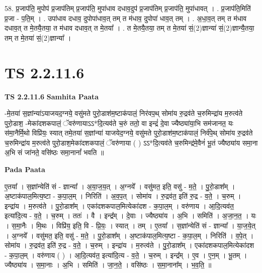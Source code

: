 \documentclass[17pt]{extarticle}
\begin{document}
58. प्र॒जाप॑ति॒ मुपोप॑ प्र॒जाप॑तिम् प्र॒जाप॑ति॒ मुपा॑धाव दधाव॒दुप॑ प्र॒जाप॑तिम् प्र॒जाप॑ति॒ मुपा॑धावत् । . प्र॒जाप॑ति॒मिति॑ प्र॒जा - प॒ति॒म् । . उपा॑धाव दधाव॒ दुपोपा॑धाव॒त् तम् त म॑धाव॒ दुपोपा॑ धाव॒त् तम् । . अ॒धा॒व॒त् तम् त म॑धाव दधाव॒त् त मे॒तयै॒तया॒ त म॑धाव दधाव॒त् त मे॒तया᳚ । . त मे॒तयै॒तया॒ तम् त मे॒तया॑ सं॒(2)ज्ञान्या॑ सं॒(2)ज्ञान्यै॒तया॒ तम् त मे॒तया॑ सं॒(2)ज्ञान्या᳚ । \newline
\pagebreak
{}
\section*{ TS 2.2.11.6 }

\textbf{TS 2.2.11.6 } \newline
\textbf{Samhita Paata} \newline

-मे॒तया॑ स॒ज्ञांन्या॑ऽयाजयद॒ग्नये॒ वसु॑मते पुरो॒डाश॑म॒ष्टाक॑पालं॒ निर॑वप॒थ् सोमा॑य रु॒द्रव॑ते च॒रुमिन्द्रा॑य म॒रुत्व॑ते पुरो॒डाश॒ -मेका॑दशकपालं॒ ॅवरु॑णायाऽऽ*दि॒त्यव॑ते च॒रुं ततो॒ वा इन्द्रं॑ दे॒वा ज्यैष्ठ्या॑या॒भि सम॑जानत॒ यः स॑मा॒नैर्मि॒थो विप्रि॑यः॒ स्यात् तमे॒तया॑ स॒ज्ञांन्या॑ याजयेद॒ग्नये॒ वसु॑मते पुरो॒डाश॑म॒ष्टाक॑पालं॒ निर्व॑पे॒थ् सोमा॑य रु॒द्रव॑ते च॒रुमिन्द्रा॑य म॒रुत्व॑ते पुरो॒डाश॒मेका॑दशकपालं॒ ॅवरु॑णाया ( ) ऽऽ*दि॒त्यव॑ते च॒रुमिन्द्र॑मे॒वैनं॑ भू॒तं ज्यैष्ठ्या॑य समा॒ना अ॒भि सं जा॑नते॒ वसि॑ष्ठः समा॒नानां᳚ भवति ॥ \newline

\textbf{Pada Paata} \newline

ए॒तया᳚ । स॒ज्ञांन्येति॑ सं - ज्ञान्या᳚ । अ॒या॒ज॒य॒त् । अ॒ग्नये᳚ । वसु॑मत॒ इति॒ वसु॑ - म॒ते॒ । पु॒रो॒डाश᳚म् । अ॒ष्टाक॑पाल॒मित्य॒ष्टा - क॒पा॒ल॒म् । निरिति॑ । अ॒व॒प॒त् । सोमा॑य । रु॒द्रव॑त॒ इति॑ रु॒द्र - व॒ते॒ । च॒रुम् । इन्द्रा॑य । म॒रुत्व॑ते । पु॒रो॒डाश᳚म् । एका॑दशकपाल॒मित्येका॑दश - क॒पा॒ल॒म् । वरु॑णाय । आ॒दि॒त्यव॑त॒ इत्या॑दि॒त्य - व॒ते॒ । च॒रुम् । ततः॑ । वै । इन्द्र᳚म् । दे॒वाः । ज्यैष्ठ्या॑य । अ॒भि । समिति॑ । अ॒जा॒न॒त॒ । यः । स॒मा॒नैः । मि॒थः । विप्रि॑य॒ इति॒ वि - प्रि॒यः॒ । स्यात् । तम् । ए॒तया᳚ । स॒ज्ञांन्येति॑ सं - ज्ञान्या᳚ । या॒ज॒ये॒त् । अ॒ग्नये᳚ । वसु॑मत॒ इति॒ वसु॑ - म॒ते॒ । पु॒रो॒डाश᳚म् । अ॒ष्टाक॑पाल॒मित्य॒ष्टा - क॒पा॒ल॒म् । निरिति॑ । व॒पे॒त् । सोमा॑य । रु॒द्रव॑त॒ इति॑ रु॒द्र - व॒ते॒ । च॒रुम् । इन्द्रा॑य । म॒रुत्व॑ते । पु॒रो॒डाश᳚म् । एका॑दशकपाल॒मित्येका॑दश - क॒पा॒ल॒म् । वरु॑णाय ( ) । आ॒दि॒त्यव॑त॒ इत्या॑दि॒त्य - व॒ते॒ । च॒रुम् । इन्द्र᳚म् । ए॒व । ए॒न॒म् । भू॒तम् । ज्यैष्ठ्या॑य । स॒मा॒नाः । अ॒भि । समिति॑ । जा॒न॒ते॒ । वसि॑ष्ठः । स॒मा॒नाना᳚म् । भ॒व॒ति॒ ॥  \newline
\end{document}
